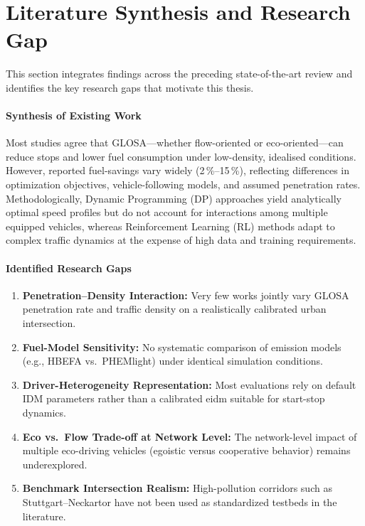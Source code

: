 \section{Literature Synthesis and Research Gap}
\label{sec:research_gap}

This section integrates findings across the preceding state-of-the-art review and identifies the key research gaps that motivate this thesis.

\paragraph{Synthesis of Existing Work}  
Most studies agree that GLOSA—whether flow-oriented or eco-oriented—can reduce stops and lower fuel consumption under low-density, idealised conditions. However, reported fuel-savings vary widely (2\,\%–15\,\%), reflecting differences in optimization objectives, vehicle-following models, and assumed penetration rates. Methodologically, Dynamic Programming (DP) approaches yield analytically optimal speed profiles but do not account for interactions among multiple equipped vehicles, whereas Reinforcement Learning (RL) methods adapt to complex traffic dynamics at the expense of high data and training requirements.

\paragraph{Identified Research Gaps}  
\begin{enumerate}
  \item \textbf{Penetration–Density Interaction:} Very few works jointly vary GLOSA penetration rate and traffic density on a realistically calibrated urban intersection.  
  \item \textbf{Fuel-Model Sensitivity:} No systematic comparison of emission models (e.g., HBEFA vs.\ PHEMlight) under identical simulation conditions.  
  \item \textbf{Driver-Heterogeneity Representation:} Most evaluations rely on default IDM parameters rather than a calibrated \ac{eidm} suitable for start-stop dynamics.  
  \item \textbf{Eco vs.\ Flow Trade-off at Network Level:} The network-level impact of multiple eco-driving vehicles (egoistic versus cooperative behavior) remains underexplored.  
  \item \textbf{Benchmark Intersection Realism:} High-pollution corridors such as Stuttgart–Neckartor have not been used as standardized testbeds in the literature.
\end{enumerate}

